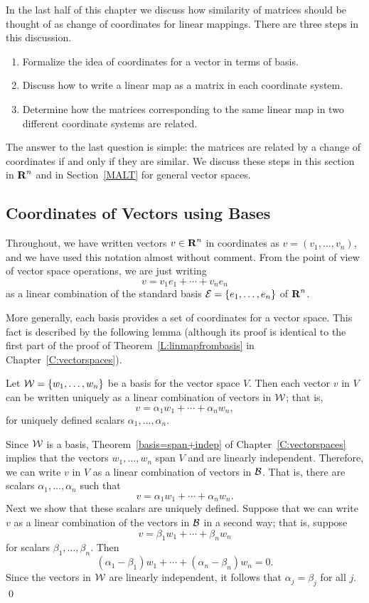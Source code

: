   \label{S:coordinates}

In the last half of this chapter we discuss how similarity of matrices should
be thought of as change of coordinates for linear mappings.  There are three
steps in this discussion.
\begin{enumerate}
\item 	Formalize the idea of coordinates for a vector in terms of basis.
\item	Discuss how to write a linear map as a matrix in each coordinate
	system.
\item	Determine how the matrices corresponding to the same linear map in
	two different coordinate systems are related.
 \end{enumerate}
The answer to the last question is simple: the matrices are related by a
change of coordinates if and only if they are similar.  We discuss these
steps in this section in $\mbox{$\bf{R}$}^n$ and in Section~\ref{MALT} for general vector
spaces.


\subsection*{Coordinates of Vectors using Bases}

Throughout, we have written vectors $v\in\mbox{$\bf{R}$}^n$ in coordinates as
$v = (v_1,\ldots,v_n)$, and we have used this notation almost without
comment.  From the point of view of vector space operations, we are
just writing
\[
v = v_1e_1 + \cdots + v_ne_n
\]
as a linear combination  of the standard basis
${\cal E} = \{e_1,\ldots,e_n\}$ of $\mbox{$\bf{R}$}^n$.

More generally, each basis provides a set of coordinates for a vector space.
This fact is described by the following lemma (although its proof is identical 
to the first part of the proof of Theorem~\ref{L:linmapfrombasis} in 
Chapter~\ref{C:vectorspaces}).

\begin{lemma} \label{L:coordinates}
Let ${\cal W}=\{w_1,\ldots,w_n\}$ be a basis for the vector space $V$.  Then
each vector $v$ in $V$ can be written uniquely as a linear combination of
vectors in ${\cal W}$; that is,
\[
v = \alpha_1w_1 +\cdots + \alpha_nw_n,
\]
for uniquely defined scalars $\alpha_1,\ldots,\alpha_n$.
\end{lemma}

\proof  Since ${\cal W}$ is a basis, Theorem~\ref{basis=span+indep} of
Chapter~\ref{C:vectorspaces} implies that the vectors $w_1,\ldots,w_n$ span
$V$ and are linearly independent.  Therefore, we can write $v$ in $V$ as a
linear combination of vectors in ${\cal B}$.   That is, there are scalars
$\alpha_1,\ldots,\alpha_n$ such that
\[
v = \alpha_1w_1 +\cdots + \alpha_nw_n.
\]
Next we show that these scalars are uniquely defined.  Suppose that we can 
write $v$ as a linear combination of the vectors in ${\cal B}$ in a second 
way; that is, suppose 
\[
v = \beta_1w_1 + \cdots + \beta_nw_n
\]
for scalars $\beta_1,\ldots,\beta_n$.  Then
\[
(\alpha_1-\beta_1)w_1 + \cdots + (\alpha_n-\beta_n)w_n = 0.
\]
Since the vectors in ${\cal W}$ are linearly independent, it
follows that $\alpha_j=\beta_j$ for all $j$.  \qed

